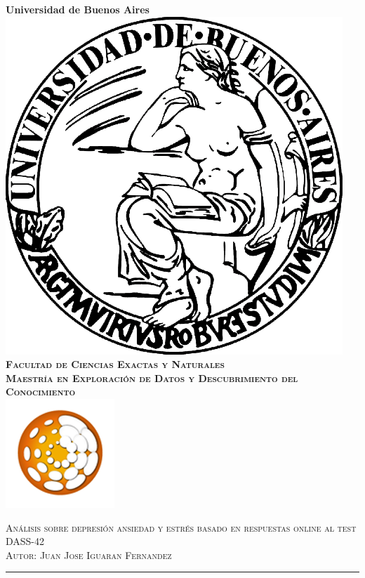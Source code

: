 \begin{titlepage}
\begin{center}
\Huge{\bf{Universidad de Buenos Aires}} \\ [1cm] 
\includegraphics[scale = 0.25]{Media/Pictures/uba.png} \\ [1cm] 
\textsc{\bf{\Large Facultad de Ciencias Exactas y Naturales}} \\ 
\textsc{\bf{\normalsize Maestría en Exploración de Datos y Descubrimiento del Conocimiento}} \\ [1cm]
\includegraphics[scale = 1]{Media/Pictures/data_mining.png} \\ [0.5cm]
\end{center}
\hspace{4cm}

\newcommand{\HRule}{\rule{\linewidth}{0.5mm}}

\begin{center}
\textsc{\large Análisis sobre depresión ansiedad y estrés basado en respuestas online al test DASS-42} \\ [2cm] 

\textsc{\small Autor: Juan Jose Iguaran Fernandez} \\ 
\HRule \\ [0.2cm]

\end{center}


\end{titlepage}